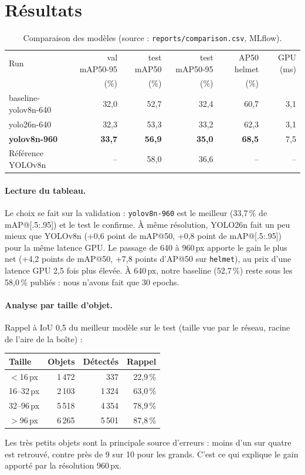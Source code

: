 \documentclass[11pt,a4paper]{article}
\begin{document}
\section{Résultats}
\begin{table}[H]\centering
\begin{tabular}{lrrrrr}\toprule
Run & val mAP50-95 & test mAP50 & test mAP50-95 & AP50 helmet & GPU (ms)\\
 & (\%) & (\%) & (\%) & (\%) & \\\midrule
baseline-yolov8n-640 & 32,0 & 52,7 & 32,4 & 60,7 & 3,1\\
yolo26n-640 & 32,3 & 53,3 & 33,2 & 62,3 & 3,1\\
\textbf{yolov8n-960} & \textbf{33,7} & \textbf{56,9} & \textbf{35,0} & \textbf{68,5} & 7,5\\
\midrule
Référence YOLOv8n \cite{sh17} & -- & 58,0 & 36,6 & -- & --\\\bottomrule
\end{tabular}
\caption{Comparaison des modèles (source : \texttt{reports/comparison.csv}, MLflow).}
\end{table}

\paragraph{Lecture du tableau.} Le choix se fait sur la validation : \texttt{yolov8n-960} est le meilleur
(33,7\,\% de mAP@[.5:.95]) et le test le confirme. À même résolution, YOLO26n fait un peu mieux que
YOLOv8n (+0,6 point de mAP@50, +0,8 point de mAP@[.5:.95]) pour la même latence GPU. Le passage de 640 à
960\,px apporte le gain le plus net (+4,2 points de mAP@50, +7,8 points d'AP@50 sur \texttt{helmet}), au prix
d'une latence GPU 2,5 fois plus élevée. À 640\,px, notre baseline (52,7\,\%) reste sous les 58,0\,\% publiés :
nous n'avons fait que 30 epochs.

\paragraph{Analyse par taille d'objet.} Rappel à IoU 0,5 du meilleur modèle sur le test (taille vue par le
réseau, racine de l'aire de la boîte) :

\begin{table}[H]\centering
\begin{tabular}{lrrr}\toprule
Taille & Objets & Détectés & Rappel\\\midrule
$<$16\,px & 1\,472 & 337 & 22,9\,\%\\
16--32\,px & 2\,103 & 1\,324 & 63,0\,\%\\
32--96\,px & 5\,518 & 4\,354 & 78,9\,\%\\
$>$96\,px & 6\,265 & 5\,501 & 87,8\,\%\\\bottomrule
\end{tabular}\end{table}
Les très petits objets sont la principale source d'erreurs : moins d'un sur quatre est retrouvé, contre près
de 9 sur 10 pour les grands. C'est ce qui explique le gain apporté par la résolution 960\,px.
\end{document}
